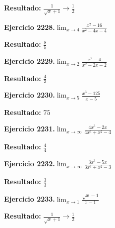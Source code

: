 \documentclass[10pt,a4paper]{article}
\begin{document}
\begin{solbox}
\textbf{Resultado:} \(\displaystyle \frac{1}{\sqrt{x}+1} \to \frac{1}{2}\)
\end{solbox}

\newpage
\begin{ejbox}
\textbf{Ejercicio 2228.}\quad $\lim_{x\to 4} \frac{x^2-16}{x^2-4x-4}$
\end{ejbox}

\begin{solbox}
\textbf{Resultado:} \(\displaystyle \frac{8}{5}\)
\end{solbox}

\begin{ejbox}
\textbf{Ejercicio 2229.}\quad $\lim_{x\to 2} \frac{x^2-4}{x^2-2x-2}$
\end{ejbox}

\begin{solbox}
\textbf{Resultado:} \(\displaystyle \frac{4}{3}\)
\end{solbox}

\begin{ejbox}
\textbf{Ejercicio 2230.}\quad $\lim_{x\to 5} \frac{x^3-125}{x-5}$
\end{ejbox}

\begin{solbox}
\textbf{Resultado:} \(\displaystyle 75\)
\end{solbox}

\newpage
\begin{ejbox}
\textbf{Ejercicio 2231.}\quad $\lim_{x\to \infty} \frac{4x^3 - 2x}{4x^3 + x^2 - 4}$
\end{ejbox}

\begin{solbox}
\textbf{Resultado:} \(\displaystyle \frac{4}{4}\)
\end{solbox}

\begin{ejbox}
\textbf{Ejercicio 2232.}\quad $\lim_{x\to \infty} \frac{3x^3 - 5x}{3x^3 + x^2 - 3}$
\end{ejbox}

\begin{solbox}
\textbf{Resultado:} \(\displaystyle \frac{3}{3}\)
\end{solbox}

\begin{ejbox}
\textbf{Ejercicio 2233.}\quad $\lim_{x\to 1} \frac{\sqrt{x}-1}{x-1}$
\end{ejbox}

\begin{solbox}
\textbf{Resultado:} \(\displaystyle \frac{1}{\sqrt{x}+1} \to \frac{1}{2}\)
\end{solbox}
\end{document}
